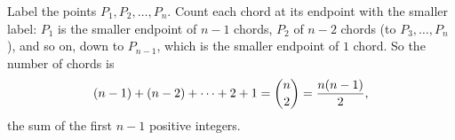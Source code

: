 Label the points $P_1,P_2,\dots,P_n$. Count each chord at its endpoint with the smaller label: $P_1$ is the smaller endpoint of $n-1$ chords, $P_2$ of $n-2$ chords (to $P_3,\dots,P_n$), and so on, down to $P_{n-1}$, which is the smaller endpoint of $1$ chord. So the number of chords is
\[(n-1)+(n-2)+\cdots+2+1=\dbinom n2=\dfrac{n(n-1)}{2},\]
the sum of the first $\boxed{n-1}$ positive integers.
